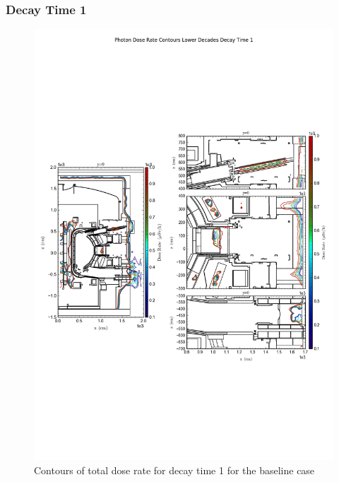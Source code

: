\documentclass[12pt]{article}
\begin{document}
\subsubsection*{Decay Time 1}
\begin{figure}[ht!]
\centering
\includegraphics[trim={0cm 8cm, 0cm 8cm},clip,scale=0.75]{../plots/final_model/Photon_Dose_Rate_Contours_Lower_Decades_Decay_Time_1.png}
\caption{Contours of total dose rate for decay time 1 for the baseline case}
\label{fig:photons_dc1_nob4c_contours_l}
\end{figure}
\end{document}
